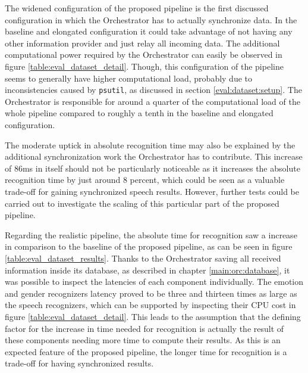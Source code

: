 { %
The widened configuration of the proposed pipeline is the first discussed configuration in which the Orchestrator has to actually synchronize data. 
In the baseline and elongated configuration it could take advantage of not having any other information provider and just relay all incoming data.
The additional computational power required by the Orchestrator can easily be observed in figure \ref{table:eval_dataset_detail}.
Though, this configuration of the pipeline seems to generally have higher computational load, probably due to inconsistencies caused by \texttt{psutil}, as discussed in section \ref{eval:dataset:setup}.
The Orchestrator is responsible for around a quarter of the computational load of the whole pipeline compared to roughly a tenth in the baseline and elongated configuration.

The moderate uptick in absolute recognition time may also be explained by the additional synchronization work the Orchestrator has to contribute. 
This increase of 86ms in itself should not be particularly noticeable as it increases the absolute recognition time by just around 8 percent, which could be seen as a valuable trade-off for gaining synchronized speech results. 
However, further tests could be carried out to investigate the scaling of this particular part of the proposed pipeline.
}

{ %
Regarding the realistic pipeline, the absolute time for recognition saw a increase in comparison to the baseline of the proposed pipeline, as can be seen in figure \ref{table:eval_dataset_results}.
Thanks to the Orchestrator saving all received information inside its database, as described in chapter \ref{main:orc:database}, it was possible to inspect the latencies of each component individually.
The emotion and gender recognizers latency proved to be three and thirteen times as large as the speech recognizers, which can be supported by inspecting their CPU cost in figure \ref{table:eval_dataset_detail}.
This leads to the assumption that the defining factor for the increase in time needed for recognition is actually the result of these components needing more time to compute their results.
As this is an expected feature of the proposed pipeline, the longer time for recognition is a trade-off for having synchronized results.
}

